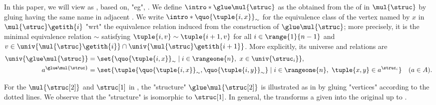 %
In this paper, we will view  as \emph{}, based on, "eg", \cite{nakamuraPartialDerivativesGraphs2017,nakamuraDerivativesGraphsPositive2025}.
\AP {}
We define $\intro*\glue \mul{\struc}$ \cite[Definition 5.1]{nakamuraDerivativesGraphsPositive2025} as the 
obtained from the  of  in $\mul{\struc}$ by gluing  having the same name in adjacent .
We write $\intro*\quo{\tuple{i, x}}_{\sim}$ for the 
equivalence class of the vertex named by $x$ in $\mul{\struc}\getith{i}$ "wrt" the equivalence relation induced from the construction of $\glue \mul{\struc}$; more precisely, it is the minimal equivalence relation $\sim$
satisfying $\tuple{i, v} \sim \tuple{i+1, v}$ for all $i \in \range{1}{n-1}$ and $v \in \univ{\mul{\struc}\getith{i}} \cap \univ{\mul{\struc}\getith{i+1}}$.
More explicitly, its universe and relations are
\begin{align*}
\univ{\glue\mul{\struc}}
&= \set{\quo{\tuple{i,x}}_{\sim} \mid i \in \rangeone{n},\ x \in \univ{\struc_i}},\\
a^{\glue\mul{\struc}}
&= \set{\tuple{\quo{\tuple{i,x}}_{\sim},\quo{\tuple{i,y}}_{\sim}} \mid i \in \rangeone{n},\ \tuple{x,y} \in a^{\struc_i}}
\quad (a \in A).
\end{align*}
\begin{example}
For the $\mul{\struc[2]}$ and $\struc[1]$ in ,
the "structure" $\glue \mul{\struc[2]}$ is illustrated as in  by gluing "vertices" according to the dotted lines.
We observe that the "structure" is isomorphic to $\struc[1]$.
In general, the  transforms a given  into the original  up to .
\end{example}
